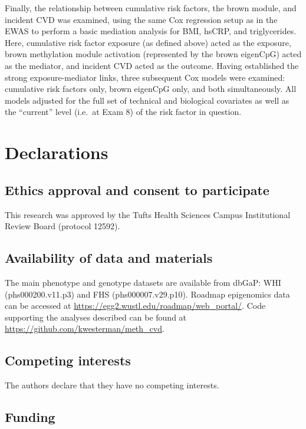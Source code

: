\documentclass[]{bmcart}
\theoremstyle{definition}
\theoremstyle{definition}
\theoremstyle{definition}
\theoremstyle{remark}
\begin{document}
Finally, the relationship between cumulative risk factors, the brown
module, and incident CVD was examined, using the same Cox regression
setup as in the EWAS to perform a basic mediation analysis for BMI,
hsCRP, and triglycerides. Here, cumulative risk factor exposure (as
defined above) acted as the exposure, brown methylation module
activation (represented by the brown eigenCpG) acted as the mediator,
and incident CVD acted as the outcome. Having established the strong
exposure-mediator links, three subsequent Cox models were examined:
cumulative risk factors only, brown eigenCpG only, and both
simultaneously. All models adjusted for the full set of technical and
biological covariates as well as the ``current'' level (i.e.~at Exam 8)
of the risk factor in question.

\section{Declarations}\label{declarations}

\subsection{Ethics approval and consent to
participate}\label{ethics-approval-and-consent-to-participate}

This research was approved by the Tufts Health Sciences Campus
Institutional Review Board (protocol 12592).

\subsection{Availability of data and
materials}\label{availability-of-data-and-materials}

The main phenotype and genotype datasets are available from dbGaP: WHI
(phs000200.v11.p3) and FHS (phs000007.v29.p10). Roadmap epigenomics data
can be accessed at \url{https://egg2.wustl.edu/roadmap/web_portal/}.
Code supporting the analyses described can be found at
\url{https://github.com/kwesterman/meth_cvd}.

\subsection{Competing interests}\label{competing-interests}

The authors declare that they have no competing interests.

\subsection{Funding}\label{funding}
\end{document}
